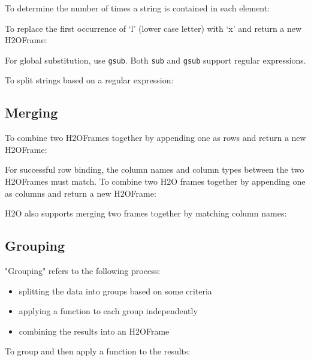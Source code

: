 {To determine the number of times a string is contained in each element:


To replace the first occurrence of `l' (lower case letter) with `x' and return a new H2OFrame:


For global substitution, use {\texttt{gsub}}.  Both {\texttt{sub}} and {\texttt{gsub}} support regular expressions. 

To split strings based on a regular expression:



\subsection{Merging}
To combine two H2OFrames together by appending one as rows and return a new H2OFrame:


For successful row binding, the column names and column types between the two H2OFrames must match. To combine two H2O frames together by appending one as columns and return a new H2OFrame:



\newpage
H2O also supports merging two frames together by matching column names:


\subsection{Grouping}

"Grouping" refers to the following process:

\begin{itemize}
\item splitting the data into groups based on some criteria 
\item applying a function to each group independently
\item combining the results into an H2OFrame
\end{itemize}

To group and then apply a function to the results:


}

